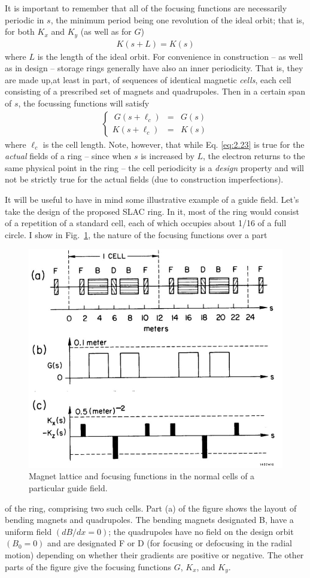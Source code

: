 It is important to remember that all of the focusing functions are necessarily periodic in $s$, the minimum period being one revolution of the ideal orbit; that is, for both $K_x$ and $K_y$ (as well as for $G$)
\begin{align}
	K(s+L) = K(s)\label{eq:2.23}
\end{align}
where $L$ is the length of the ideal orbit. For convenience in construction -- as well as in design -- storage rings generally have also an inner periodicity. That is, they are made up,at least in part, of sequences of identical magnetic \textit{cells},
each cell consisting of a prescribed set of magnets and quadrupoles. Then in a certain span of $s$, the focussing functions will satisfy
\begin{align}
	\left\{\begin{array}{rcl}
	\ G(s+\ell_c) & = & G(s)\\
	K(s+\ell_c) & = & K(s)
	\end{array}\right.
\end{align}
where $\ell_c$ is the cell length. Note, however, that while Eq. \eqref{eq:2.23} is true for the \textit{actual} fields of a ring -- since when $s$ is increased by $L$, the electron returns to the same physical point in the ring -- the cell periodicity is a \textit{design} property and will not be strictly true for the actual fields (due to construction imperfections).

It will be useful to have in mind some illustrative example of a guide field. Let’s take the design of the proposed SLAC ring. In it, most of the ring would consist of a repetition of a standard cell, each of which occupies about 1/16 of a full circle. I show in Fig.~\ref{fig:fig10}, the nature of the focusing functions over a part

\begin{figure}[!htb]
	\centering
	\includegraphics[width=0.7\linewidth]{./Figuras/fig10.jpeg}
	\caption{Magnet lattice and focusing functions in the normal cells
	of a particular guide field.}
	\label{fig:fig10}
\end{figure}
of the ring, comprising two such cells. Part (a) of the figure shows the layout of bending magnets and quadrupoles. The bending magnets designated B, have a uniform field $(dB/dx = 0)$; the quadrupoles have no field on the design orbit $(B_0=0)$ and are designated F or D (for focusing or defocusing in the radial motion) depending on whether their gradients are positive or negative. The other parts of the figure give the focusing functions $G$, $K_x$, and $K_y$.
